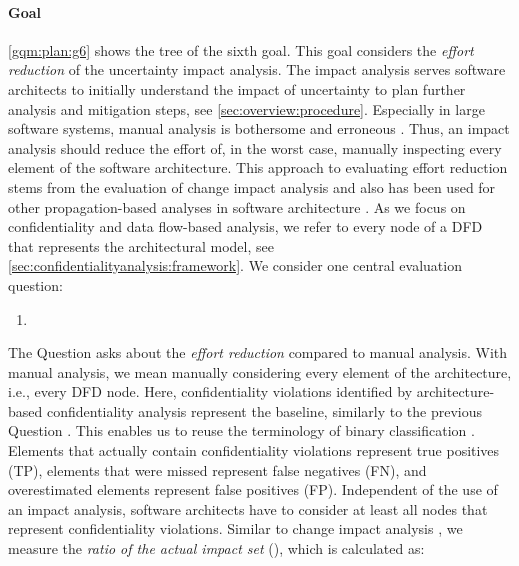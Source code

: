 \paragraph{Goal }\label{gqm:text:g:6}
\autoref{gqm:plan:g6} shows the tree of the sixth goal.
This goal considers the \emph{effort reduction} of the uncertainty impact analysis.
The impact analysis serves software architects to initially understand the impact of uncertainty to plan further analysis and mitigation steps, see \autoref{sec:overview:procedure}.
Especially in large software systems, manual analysis is bothersome and erroneous \cite{seifermann_data-driven_2019}.
Thus, an impact analysis should reduce the effort of, in the worst case, manually inspecting every element of the software architecture.
This approach to evaluating effort reduction stems from the evaluation of change impact analysis \cite{rostami_architecture-based_2017,busch_architecture-based_2020} and also has been used for other propagation-based analyses in software architecture \cite{walter_architectural_2022,hahner_architecture-based_2024}.
As we focus on confidentiality and data flow-based analysis, we refer to every node of a \acf{DFD} that represents the architectural model, see \autoref{sec:confidentialityanalysis:framework}.
We consider one central evaluation question:

\begin{enumerate}[leftmargin=\GQMquestionsIndent]
  \item[\question{6}{1}] \textGviQi 
\end{enumerate}

\label{gqm:text:q:6:1}
The Question  asks about the \emph{effort reduction} compared to manual analysis.
With manual analysis, we mean manually considering every element of the architecture, i.e., every \ac{DFD} node.
Here, confidentiality violations identified by architecture-based confidentiality analysis \cite{seifermann_detecting_2022,boltz_extensible_2024} represent the baseline, similarly to the previous Question .
This enables us to reuse the terminology of binary classification \cite{powers_evaluation_2011,van_rijsbergen_information_1979}.
Elements that actually contain confidentiality violations represent true positives (TP), elements that were missed represent false negatives (FN), and overestimated elements represent false positives (FP).
Independent of the use of an impact analysis, software architects have to consider at least all nodes that represent confidentiality violations.
Similar to change impact analysis \cite{rostami_architecture-based_2017}, we measure the \emph{ratio of the actual impact set} (\label{gqm:text:m:6:1:1}), which is calculated as:

